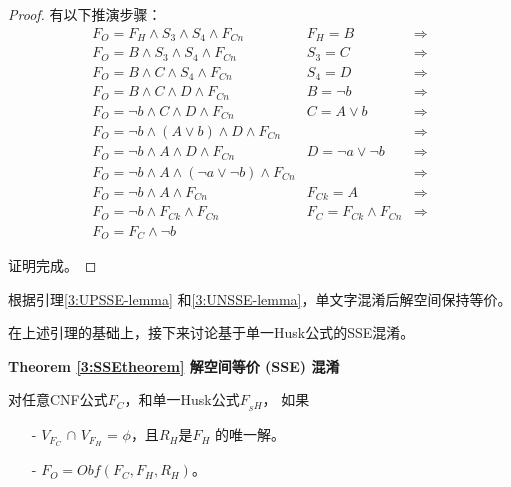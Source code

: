 \begin{proof}
 有以下推演步骤：
 \begin{equation}
 \begin{array}{ccc}
 F_O  =  F_H \wedge S_3\wedge S_4\wedge F_{Cn}                      &F_H=B      &\Longrightarrow\\
 F_O  =  B \wedge S_3\wedge S_4\wedge F_{Cn}                        &S_3=C      &\Longrightarrow\\
 F_O  =  B \wedge C\wedge S_4\wedge F_{Cn}                          &S_4=D      &\Longrightarrow\\
 F_O  =  B\wedge C\wedge D\wedge F_{Cn}                             &B=\neg b                    &\Longrightarrow\\
 F_O  =  \neg b\wedge C\wedge D\wedge F_{Cn}                        &C=A\vee b               &\Longrightarrow\\
 F_O  =  \neg b\wedge (A\vee  b) \wedge D\wedge F_{Cn}              &                            &\Longrightarrow\\
 F_O  =  \neg b\wedge A \wedge D\wedge F_{Cn}                       &D=\neg a\vee \neg b     &\Longrightarrow\\
 F_O  =  \neg b\wedge A \wedge (\neg a\vee \neg b)\wedge F_{Cn}     &                            &\Longrightarrow\\
 F_O  =  \neg b\wedge A \wedge F_{Cn}                               &F_{Ck}=A                    &\Longrightarrow\\
 F_O  =  \neg b\wedge F_{Ck}\wedge F_{Cn}                        & F_C=F_{Ck} \wedge F_{Cn}   &\Longrightarrow\\
 F_O  =  F_C\wedge \neg b                                           &   &
 \end{array}
 \end{equation}

证明完成。
 \end{proof}

根据引理\ref{3:UPSSE-lemma} 和\ref{3:UNSSE-lemma}，单文字混淆后解空间保持等价。

在上述引理的基础上，接下来讨论基于单一Husk公式的SSE混淆。

\textbf{Theorem \ref{3:SSEtheorem} 解空间等价 (SSE) 混淆}

对任意CNF公式$F_C$，和单一Husk公式$F_{_SH}$， 如果

\begin{enumerate}
 \item[-] $V_{F_C}$ $\cap$ $V_{F_H}$ = $\phi$，且$R_H$是$F_H$ 的唯一解。
 \item[-] $F_O=Obf(F_C,F_H,R_H)$。
\end{enumerate}

